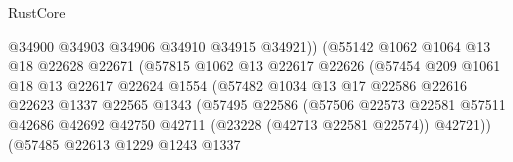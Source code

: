 \begin{lexlean}{RustCore}
\begin{coremodule}
                                        @34900
                                        @34903
                                        @34906
                                        @34910
                                        @34915
                                        @34921))
                                    (@55142
                                      @1062
                                      @1064
                                      @13
                                      @18
                                      @22628
                                      @22671
                                      (@57815
                                        @1062
                                        @13
                                        @22617
                                        @22626
                                        (@57454
                                          @209
                                          @1061
                                          @18
                                          @13
                                          @22617
                                          @22624
                                          @1554
                                          (@57482
                                            @1034
                                            @13
                                            @17
                                            @22586
                                            @22616
                                            @22623
                                            @1337
                                            @22565
                                            @1343
                                            (@57495
                                              @22586
                                              (@57506
                                                @22573
                                                @22581
                                                @57511
                                                @42686
                                                @42692
                                                @42750
                                                @42711
                                                (@23228 (@42713 @22581 @22574))
                                                @42721))
                                            (@57485
                                              @22613
                                              @1229
                                              @1243
                                              @1337

\end{coremodule}
\end{lexlean}
